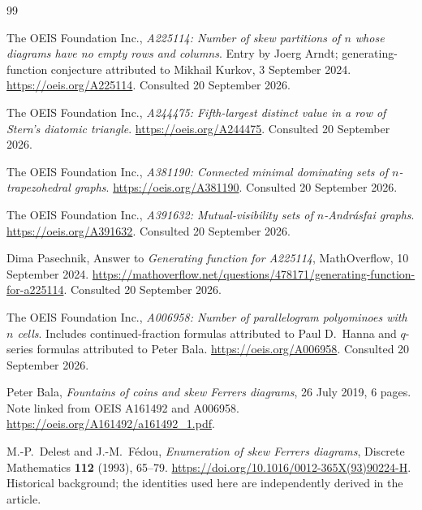 \documentclass[11pt,letterpaper]{article}
\numberwithin{equation}{section}
\theoremstyle{definition}
\begin{document}
\begin{thebibliography}{99}
\raggedright
{}

The OEIS Foundation Inc.,
\emph{A225114: Number of skew partitions of $n$ whose diagrams have no
empty rows and columns}.
Entry by Joerg Arndt; generating-function conjecture attributed to
Mikhail Kurkov, 3 September 2024.
\url{https://oeis.org/A225114}. Consulted 20 September 2026.

The OEIS Foundation Inc.,
\emph{A244475: Fifth-largest distinct value in a row of Stern's diatomic
triangle}.
\url{https://oeis.org/A244475}. Consulted 20 September 2026.

The OEIS Foundation Inc.,
\emph{A381190: Connected minimal dominating sets of $n$-trapezohedral graphs}.
\url{https://oeis.org/A381190}. Consulted 20 September 2026.

The OEIS Foundation Inc.,
\emph{A391632: Mutual-visibility sets of $n$-Andr\'asfai graphs}.
\url{https://oeis.org/A391632}. Consulted 20 September 2026.

Dima Pasechnik,
Answer to \emph{Generating function for A225114}, MathOverflow,
10 September 2024.
\url{https://mathoverflow.net/questions/478171/generating-function-for-a225114}.
Consulted 20 September 2026.

The OEIS Foundation Inc.,
\emph{A006958: Number of parallelogram polyominoes with $n$ cells}.
Includes continued-fraction formulas attributed to Paul D.\ Hanna and
$q$-series formulas attributed to Peter Bala.
\url{https://oeis.org/A006958}. Consulted 20 September 2026.

Peter Bala,
\emph{Fountains of coins and skew Ferrers diagrams}, 26 July 2019, 6 pages.
Note linked from OEIS A161492 and A006958.
\url{https://oeis.org/A161492/a161492_1.pdf}.

M.-P.\ Delest and J.-M.\ F\'edou,
\emph{Enumeration of skew Ferrers diagrams},
Discrete Mathematics \textbf{112} (1993), 65--79.
\url{https://doi.org/10.1016/0012-365X(93)90224-H}.
Historical background; the identities used here are independently derived
in the article.

\end{thebibliography}
\end{document}
